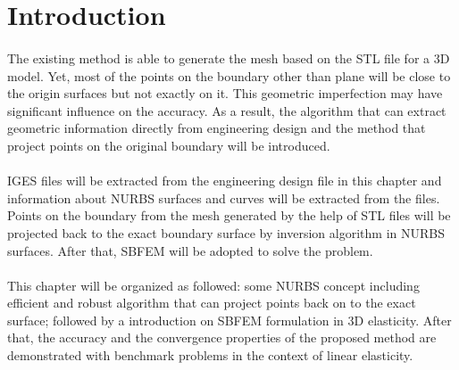 \section{Introduction}
\paragraph{}
The existing method is able to generate the mesh based on the STL file for a 3D model.
Yet, most of the points on the boundary other than plane will be close to the origin surfaces but not exactly on it.
This geometric imperfection may have significant influence on the accuracy.
As a result, the algorithm that can extract geometric information directly from engineering design and the method that project points on the original boundary will be introduced.

\paragraph{}
IGES files will be extracted from the engineering design file in this chapter and information about NURBS surfaces and curves will be extracted from the files.
Points on the boundary from the mesh generated by the help of STL files will be projected back to the exact boundary surface by inversion algorithm in NURBS surfaces.
After that, SBFEM will be adopted to solve the problem.

\paragraph{}
This chapter will be organized as followed: some NURBS concept including efficient and robust algorithm that can project points back on to the exact surface; followed by a introduction on SBFEM formulation in 3D elasticity. After that, the accuracy and the convergence properties of the proposed method are demonstrated with benchmark problems in the context of linear elasticity.